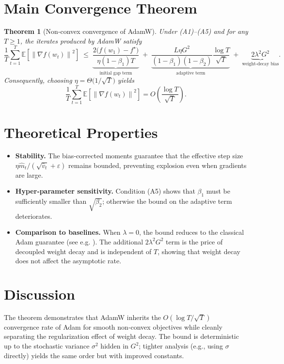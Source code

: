 \documentclass{article}
\newtheorem{theorem}{Theorem}
\newcommand{\EE}{\mathbb{E}}
\newcommand{\norm}[1]{\left\| #1\right\|}
\begin{document}
\section*{Main Convergence Theorem}
\begin{theorem}[Non‑convex convergence of AdamW]\label{thm:adamw}
Under (A1)–(A5) and for any $T\ge1$, the iterates produced by AdamW satisfy
\[
\frac{1}{T}\sum_{t=1}^{T}\EE\!\left[\norm{\nabla f(w_t)}^2\right]
\;\le\;
\underbrace{\frac{2\bigl(f(w_1)-f^\star\bigr)}{\eta(1-\beta_1)T}}_{\text{initial gap term}}
\;+\;
\underbrace{\frac{L\eta G^2}{(1-\beta_1)(1-\beta_2)}\frac{\log T}{\sqrt{T}}}_{\text{adaptive term}}
\;+\;
\underbrace{2\lambda^2 G^2}_{\text{weight‑decay bias}} .
\]
Consequently, choosing $\eta = \Theta\!\bigl(1/\sqrt{T}\bigr)$ yields
\[
\frac{1}{T}\sum_{t=1}^{T}\EE\!\left[\norm{\nabla f(w_t)}^2\right]=
O\!\left(\frac{\log T}{\sqrt{T}}\right).
\]
\end{theorem}

\section*{Theoretical Properties}
\begin{itemize}
\item \textbf{Stability.} The bias‑corrected moments guarantee that the effective step size
$\eta\hat m_t/(\sqrt{\hat v_t}+\varepsilon)$ remains bounded, preventing explosion even when gradients are large.
\item \textbf{Hyper‑parameter sensitivity.}
Condition (A5) shows that $\beta_1$ must be sufficiently smaller than $\sqrt{\beta_2}$; otherwise the bound on the adaptive term deteriorates.
\item \textbf{Comparison to baselines.}
When $\lambda=0$, the bound reduces to the classical Adam guarantee (see e.g. \cite{reddi2019convergence}). The additional $2\lambda^2 G^2$ term is the price of decoupled weight decay and is independent of $T$, showing that weight decay does not affect the asymptotic rate.
\end{itemize}

\section*{Discussion}
The theorem demonstrates that AdamW inherits the $O(\log T/\sqrt{T})$ convergence rate of Adam for smooth non‑convex objectives while cleanly separating the regularization effect of weight decay. The bound is deterministic up to the stochastic variance $\sigma^2$ hidden in $G^2$; tighter analysis (e.g., using $\sigma$ directly) yields the same order but with improved constants.
\end{document}
